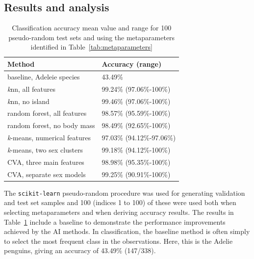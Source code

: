 \documentclass[a4paper, 11pt]{article}
\begin{document}
\subsection*{Results and analysis}

\begin{table} %
  \small
  \begin{center}
  \vspace{-3.5\baselineskip} %
  \setlength{\abovecaptionskip}{5pt}
  \setlength{\belowcaptionskip}{5pt}
  \fontsize{10}{10}\selectfont %
  \begin{tabular}{l|l}
  \textbf{Method} & \textbf{Accuracy (range)}\\
  \hline
  baseline, Adeleie species & 43.49\% \\
  \hline
  \textit{k}nn, all features & 99.24\% (97.06\%-100\%)\\
  \textit{k}nn, no island &	99.46\% (97.06\%-100\%)\\
  \hline
  random forest, all features	& 98.57\% (95.59\%-100\%)\\
  random forest, no body mass & 98.49\% (92.65\%-100\%)\\
  \hline
  \textit{k}-means, numerical features & 97.03\% (94.12\%-97.06\%)\\
  \textit{k}-means, two sex clusters  & 99.18\% (94.12\%-100\%)\\
  \hline
  CVA, three main features & 98.98\% (95.35\%-100\%)\\
  CVA, separate sex models & 99.25\% (90.91\%-100\%)\\
  \hline
  \end{tabular}
  \vspace{-2\baselineskip} %
  \end{center} 
  \caption{\centering\linespread{0.8}\selectfont Classification accuracy mean value and range for 100 pseudo-random test sets 
  and using the metaparameters identified in Table~\ref{tab:metaparameters}}
  \vspace{-1.2\baselineskip} %
  \label{tab:results}
\end{table} 

The \texttt{scikit-learn}  
pseudo-random procedure was used for generating validation and test set samples and 100 (indices 1 to 100) of these were used 
both when selecting metaparameters and when deriving accuracy results.
The results in Table~\ref{tab:results} include a baseline to demonstrate the 
performance improvements achieved by the AI methods. In classification, the
baseline method is often simply to select the most frequent class in the observations. Here, 
this is the Adelie penguins, giving an accuracy of 43.49\% (147/338). 
\end{document}
